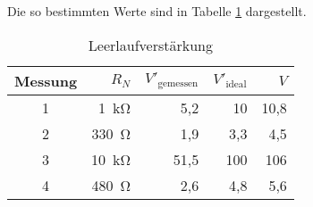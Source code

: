 Die so bestimmten Werte sind in Tabelle \ref{tab:leerlauf} dargestellt.
\begin{table}
	\centering
	\begin{tabular}{c r r r r}
		\toprule
		Messung & $R_N$ & $V'_\text{gemessen}$ & $V'_\text{ideal}$ & $V$ \\
		\midrule
		1 & \SI{1}{\kilo \ohm} & 5,2 & 10 & 10,8 \\
		2 & \SI{330}{\ohm} & 1,9 & 3,3 & 4,5 \\
		3 & \SI{10}{\kilo \ohm} & 51,5 & 100 & 106 \\
		4 & \SI{480}{\ohm} & 2,6 & 4,8 & 5,6 \\
		\bottomrule
	\end{tabular}
	\caption{Leerlaufverstärkung}
	\label{tab:leerlauf}
\end{table}

